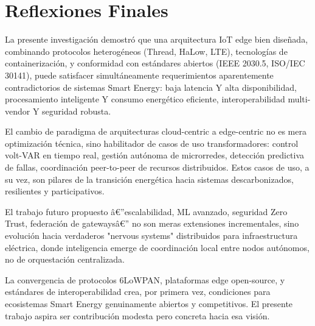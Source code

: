 \section{Reflexiones Finales}

La presente investigación demostró que una arquitectura IoT edge bien diseñada, combinando protocolos heterogéneos (Thread, HaLow, LTE), tecnologías de containerización, y conformidad con estándares abiertos (IEEE 2030.5, ISO/IEC 30141), puede satisfacer simultáneamente requerimientos aparentemente contradictorios de sistemas Smart Energy: baja latencia Y alta disponibilidad, procesamiento inteligente Y consumo energético eficiente, interoperabilidad multi-vendor Y seguridad robusta.

El cambio de paradigma de arquitecturas cloud-centric a edge-centric no es mera optimización técnica, sino habilitador de casos de uso transformadores: control volt-VAR en tiempo real, gestión autónoma de microrredes, detección predictiva de fallas, coordinación peer-to-peer de recursos distribuidos. Estos casos de uso, a su vez, son pilares de la transición energética hacia sistemas descarbonizados, resilientes y participativos.

El trabajo futuro propuesto â€”escalabilidad, ML avanzado, seguridad Zero Trust, federación de gatewaysâ€” no son meras extensiones incrementales, sino evolución hacia verdaderos "nervous systems" distribuidos para infraestructura eléctrica, donde inteligencia emerge de coordinación local entre nodos autónomos, no de orquestación centralizada.

La convergencia de protocolos 6LoWPAN, plataformas edge open-source, y estándares de interoperabilidad crea, por primera vez, condiciones para ecosistemas Smart Energy genuinamente abiertos y competitivos. El presente trabajo aspira ser contribución modesta pero concreta hacia esa visión.


